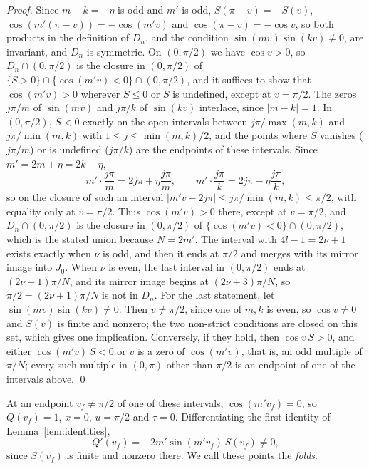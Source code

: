 \begin{proof}
Since $m-k=-\eta$ is odd and $m'$ is odd, $S(\pi-v)=-S(v)$, $\cos(m'(\pi-v))=-\cos(m'v)$ and $\cos(\pi-v)=-\cos v$, so
both products in the definition of $D_n$, and the condition $\sin(mv)\sin(kv)\neq0$, are invariant, and $D_n$ is
symmetric. On $(0,\pi/2)$ we have $\cos v>0$, so $D_n\cap(0,\pi/2)$ is the closure in $(0,\pi/2)$ of
$\{S>0\}\cap\{\cos(m'v)<0\}\cap(0,\pi/2)$, and it suffices to show that $\cos(m'v)>0$ wherever $S\le0$ or $S$ is undefined,
except at $v=\pi/2$. The zeros $j\pi/m$ of $\sin(mv)$ and $j\pi/k$ of $\sin(kv)$ interlace, since $|m-k|=1$.
In $(0,\pi/2)$, $S<0$ exactly on the open intervals between $j\pi/\max(m,k)$ and $j\pi/\min(m,k)$ with
$1\le j\le\min(m,k)/2$, and the points where $S$ vanishes ($j\pi/m$) or is undefined ($j\pi/k$) are the endpoints
of these intervals. Since $m'=2m+\eta=2k-\eta$,
\[
m'\cdot\frac{j\pi}m=2j\pi+\eta\frac{j\pi}m,\qquad m'\cdot\frac{j\pi}k=2j\pi-\eta\frac{j\pi}k,
\]
so on the closure of such an interval $|m'v-2j\pi|\le j\pi/\min(m,k)\le\pi/2$, with equality only at $v=\pi/2$.
Thus $\cos(m'v)>0$ there, except at $v=\pi/2$, and
$D_n\cap(0,\pi/2)$ is the closure in $(0,\pi/2)$ of $\{\cos(m'v)<0\}\cap(0,\pi/2)$, which is the stated union because $N=2m'$.
The interval with $4l-1=2\nu+1$ exists exactly when $\nu$ is odd, and then it ends at $\pi/2$ and merges with its mirror
image into $J_0$. When $\nu$ is even, the last interval in $(0,\pi/2)$ ends at $(2\nu-1)\pi/N$, and its mirror image begins
at $(2\nu+3)\pi/N$, so $\pi/2=(2\nu+1)\pi/N$ is not in $D_n$. For the last statement, let $\sin(mv)\sin(kv)\neq0$. Then
$v\neq\pi/2$, since one of $m,k$ is even, so $\cos v\neq0$ and $S(v)$ is finite and nonzero; the two non-strict conditions are
closed on this set, which gives one implication. Conversely, if they hold, then $\cos v\,S>0$, and either $\cos(m'v)\,S<0$
or $v$ is a zero of $\cos(m'v)$, that is, an odd multiple of $\pi/N$; every such multiple in $(0,\pi)$ other than $\pi/2$ is an
endpoint of one of the intervals above. \qed
\end{proof}

At an endpoint $v_f\neq\pi/2$ of one of these intervals, $\cos(m'v_f)=0$, so $Q(v_f)=1$, $x=0$, $u=\pi/2$ and
$\tau=0$. Differentiating the first identity of Lemma~\ref{lem:identities},
\begin{equation}\label{eq:fold}
Q'(v_f)=-2m'\sin(m'v_f)\,S(v_f)\neq0,
\end{equation}
since $S(v_f)$ is finite and nonzero there. We call these points the \emph{folds}.

